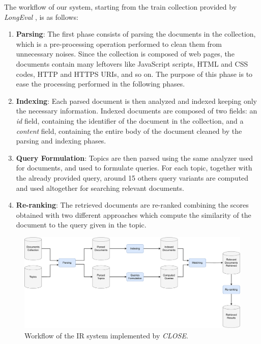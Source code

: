 The workflow of our system, starting from the train collection provided by \textit{LongEval} \cite{cleflongeval}, is as follows:
\begin{enumerate}
    \item \textbf{Parsing}: The first phase consists of parsing the documents in the collection, which is a pre-processing operation performed to clean them from unnecessary noises. Since the collection is composed of web pages, the documents contain many leftovers like JavaScript scripts, HTML and CSS codes, HTTP and HTTPS URIs, and so on. The purpose of this phase is to ease the processing performed in the following phases.

    \item \textbf{Indexing}: Each parsed document is then analyzed and indexed keeping only the necessary information. Indexed documents are composed of two fields: an \textit{id} field, containing the identifier of the document in the collection, and a \textit{content} field, containing the entire body of the document cleaned by the parsing and indexing phases.

    \item \textbf{Query Formulation}: Topics are then parsed using the same analyzer used for documents, and used to formulate queries. For each topic, together with the already provided query, around 15 others query variants are computed and used altogether for searching relevant documents.

    \item \textbf{Re-ranking}: The retrieved documents are re-ranked combining the scores obtained with two different approaches which compute the similarity of the document to the query given in the topic.

\end{enumerate}

\begin{figure}[!h]
    \centering
    \includegraphics[width=\textwidth, height=\textheight, keepaspectratio]{figure/CLOSE_IR_Workflow (2).pdf}
    \caption{Workflow of the IR system implemented by \textit{CLOSE}.}
    \label{fig:CLOSE_IR_Workflow}
\end{figure}

